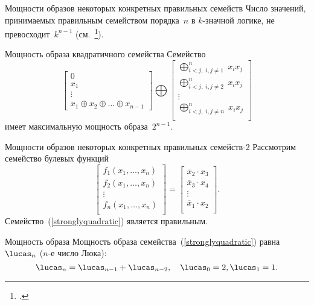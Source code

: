 \begin{frame}{Мощности образов некоторых конкретных правильных семейств}
    Число значений, принимаемых правильным семейством порядка~$n$ в $k$-значной логике, не превосходит~$k^{n-1}$ (см.~\footcite{galatenko23}).

    \begin{alertblock}{Мощность образа квадратичного семейства}
        Семейство 
        \begin{equation}
            \begin{bmatrix}
            0 \\
            x_1 \\
            \vdots \\
            x_1 \oplus x_2 \oplus \ldots \oplus x_{n-1}
            \end{bmatrix}
            \bigoplus
            \begin{bmatrix}
            \bigoplus_{i < j, \; i, j \ne 1}^n \; x_i x_j \\
            \bigoplus_{i < j, \; i, j \ne 2}^n \; x_i x_j \\
            \vdots \\
            \bigoplus_{i < j, \; i, j \ne n}^n \; x_i x_j \\
            \end{bmatrix}
        \end{equation}
        имеет максимальную мощность образа~$2^{n-1}$.
    \end{alertblock}
\end{frame}


\begin{frame}{Мощности образов некоторых конкретных правильных семейств-2}
    Рассмотрим семейство булевых функций 
    \begin{equation}
        \label{stronglyquadratic}
        \begin{bmatrix}
            f_1(x_1, \ldots, x_n) \\
            f_2(x_1, \ldots, x_n) \\
            \vdots \\
            f_n(x_1, \ldots, x_n) \\
        \end{bmatrix}
        =
        \begin{bmatrix}
            \overline{x}_2 \cdot x_3 \\
            \overline{x}_3 \cdot x_4 \\
            \vdots \\
            \overline{x}_1 \cdot x_2 \\
        \end{bmatrix}.
    \end{equation}
    \pause
    Семейство~(\ref{stronglyquadratic}) является правильным.
    \pause
    \begin{alertblock}{Мощность образа}
        Мощность образа семейства~(\ref{stronglyquadratic}) равна $\lucas_n$ ($n$-е число Люка):
        \[
            \lucas_n = \lucas_{n-1} + \lucas_{n-2}, \quad \lucas_0 = 2, \lucas_1 = 1.
        \]
    \end{alertblock}
\end{frame}


